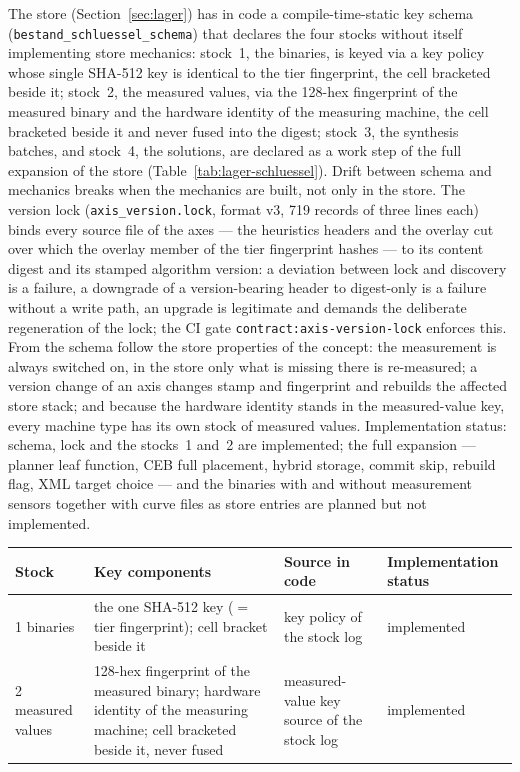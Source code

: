 \begin{nurlang}
The store (Section~\ref{sec:lager}) has in code a compile-time-static key schema
(\texttt{bestand\_\allowbreak{}schluessel\_\allowbreak{}schema}) that declares the four stocks without
itself implementing store mechanics: stock~1, the binaries, is keyed via a key policy whose single
SHA-512 key is identical to the tier fingerprint, the cell bracketed beside it; stock~2, the measured
values, via the 128-hex fingerprint of the measured binary and the hardware identity of the measuring
machine, the cell bracketed beside it and never fused into the digest; stock~3, the synthesis batches,
and stock~4, the solutions, are declared as a work step of the full expansion of the store
(Table~\ref{tab:lager-schluessel}). Drift between schema and mechanics breaks when the mechanics are
built, not only in the store. The version lock (\texttt{axis\_version.lock}, format v3, 719 records of
three lines each) binds every source file of the axes --- the heuristics headers and the overlay cut
over which the overlay member of the tier fingerprint hashes --- to its content digest and its stamped
algorithm version: a deviation between lock and discovery is a failure, a downgrade of a
version-bearing header to digest-only is a failure without a write path, an upgrade is legitimate and
demands the deliberate regeneration of the lock; the CI gate \texttt{contract:axis-version-lock}
enforces this. From the schema follow the store properties of the concept: the measurement is always
switched on, in the store only what is missing there is re-measured; a version change of an axis
changes stamp and fingerprint and rebuilds the affected store stack; and because the hardware identity
stands in the measured-value key, every machine type has its own stock of measured values.
Implementation status: schema, lock and the stocks~1 and~2 are implemented; the full expansion ---
planner leaf function, CEB full placement, hybrid storage, commit skip, rebuild flag, XML target choice
--- and the binaries with and without measurement sensors together with curve files as store entries
are planned but not implemented.
\begin{table}[htbp]\centering\footnotesize
\begin{tabular}{@{}lp{6.2cm}p{3.0cm}p{2.6cm}@{}}
\toprule
Stock & Key components & Source in code & Implementation status \\
\midrule
1 binaries & the one SHA-512 key ($=$ tier fingerprint); cell bracket beside it & key policy of the stock log & implemented \\
2 measured values & 128-hex fingerprint of the measured binary; hardware identity of the measuring machine; cell bracketed beside it, never fused & measured-value key source of the stock log & implemented \\

\end{tabular}
\end{table}
\end{nurlang}
